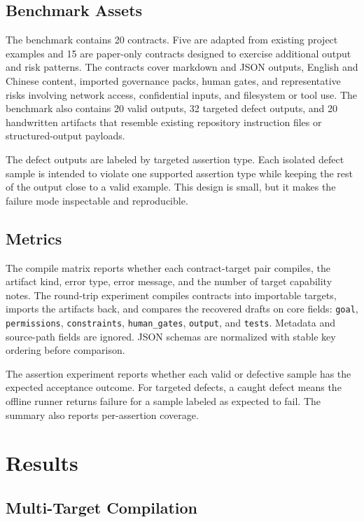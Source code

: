 \documentclass[11pt]{article}
\begin{document}
\subsection{Benchmark Assets}

The benchmark contains 20 contracts. Five are adapted from existing project examples
and 15 are paper-only contracts designed to exercise additional output and risk
patterns. The contracts cover markdown and JSON outputs, English and Chinese
content, imported governance packs, human gates, and representative risks involving
network access, confidential inputs, and filesystem or tool use. The benchmark also
contains 20 valid outputs, 32 targeted defect outputs, and 20 handwritten artifacts
that resemble existing repository instruction files or structured-output payloads.

The defect outputs are labeled by targeted assertion type. Each isolated defect
sample is intended to violate one supported assertion type while keeping the rest of
the output close to a valid example. This design is small, but it makes the failure
mode inspectable and reproducible.

\subsection{Metrics}

The compile matrix reports whether each contract-target pair compiles, the artifact
kind, error type, error message, and the number of target capability notes. The
round-trip experiment compiles contracts into importable targets, imports the
artifacts back, and compares the recovered drafts on core fields:
\texttt{goal}, \texttt{permissions}, \texttt{constraints},
\texttt{human\_gates}, \texttt{output}, and \texttt{tests}. Metadata and source-path
fields are ignored. JSON schemas are normalized with stable key ordering before
comparison.

The assertion experiment reports whether each valid or defective sample has the
expected acceptance outcome. For targeted defects, a caught defect means the
offline runner returns failure for a sample labeled as expected to fail. The summary
also reports per-assertion coverage.

\section{Results}

\subsection{Multi-Target Compilation}
\end{document}
